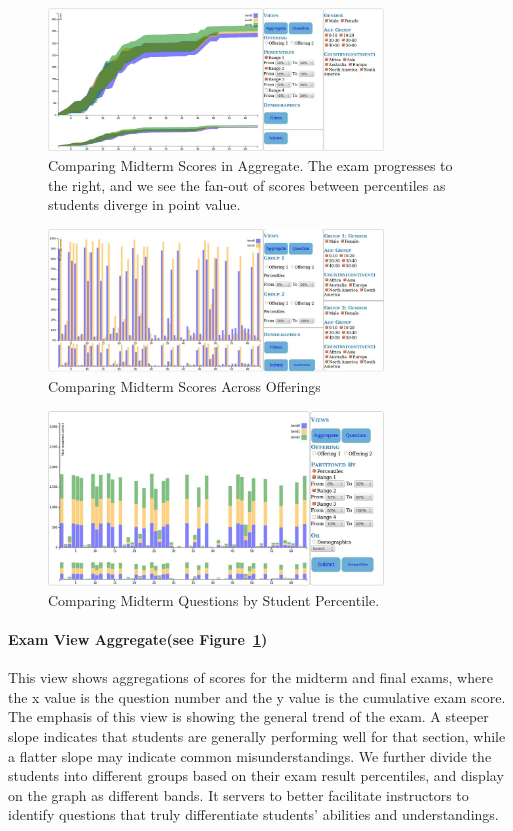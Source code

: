 \begin{figure}[htb]
 \centering
 \includegraphics[width=3.5in]{Midterm_Final_Aggregate.jpeg}
 \caption{Comparing Midterm Scores in Aggregate. The exam progresses to the right, and we see the fan-out of scores between percentiles as students diverge in point value. }
\label{fig:exam1}	
\end{figure}

\begin{figure}[htb]
 \centering
 \includegraphics[width=3.5in]{Midterm_Final_Compare.jpeg}
 \caption{Comparing Midterm Scores Across Offerings }
\label{fig:exam2}	
\end{figure}

\begin{figure}[htb]
 \centering
 \includegraphics[width=3.5in]{Midterm_Final_Questions.jpeg}
 \caption{Comparing Midterm Questions by Student Percentile. }
\label{fig:exam3}	
\end{figure}

\paragraph{Exam View Aggregate(see Figure~\ref{fig:exam1})}
This view shows aggregations of scores for the midterm and final exams, where the x value is the question number and the y value is the cumulative exam score. The emphasis of this view is showing the general trend of the exam. A steeper slope indicates that students are generally performing well for that section, while a flatter slope may indicate common misunderstandings. We further divide the students into different groups based on their exam result percentiles, and display on the graph as different bands. It servers to better facilitate instructors to identify questions that truly differentiate students' abilities and understandings.

